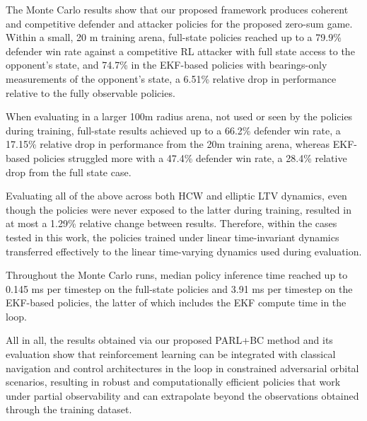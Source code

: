 The Monte Carlo results show that our proposed framework produces coherent and competitive defender and attacker policies for the proposed zero-sum game. Within a small, 20 m training arena, full-state policies reached up to a 79.9\% defender win rate against a competitive RL attacker with full state access to the opponent's state, and 74.7\% in the EKF-based policies with bearings-only measurements of the opponent's state, a 6.51\% relative drop in performance relative to the fully observable policies.

When evaluating in a larger 100m radius arena, not used or seen by the policies during training, full-state results achieved up to a 66.2\% defender win rate, a 17.15\% relative drop in performance from the 20m training arena, whereas EKF-based policies struggled more with a 47.4\% defender win rate, a 28.4\% relative drop from the full state case. 

Evaluating all of the above across both HCW and elliptic LTV dynamics, even though the policies were never exposed to the latter during training, resulted in at most a 1.29\% relative change between results. Therefore, within the cases tested in this work, the policies trained under linear time-invariant dynamics transferred effectively to the linear time-varying dynamics used during evaluation.

Throughout the Monte Carlo runs, median policy inference time reached up to 0.145 ms per timestep on the full-state policies and 3.91 ms per timestep on the EKF-based policies, the latter of which includes the EKF compute time in the loop.

All in all, the results obtained via our proposed PARL+BC method and its evaluation show that reinforcement learning can be integrated with classical navigation and control architectures in the loop in constrained adversarial orbital scenarios, resulting in robust and computationally efficient policies that work under partial observability and can extrapolate beyond the observations obtained through the training dataset.
